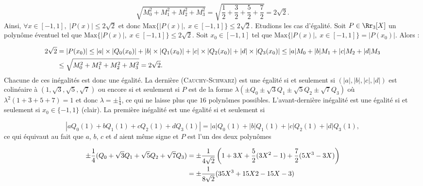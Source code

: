 {{$$\sqrt{M_0^2+M_1^2+M_2^2+M_3^2}=\sqrt{\frac{1}{2}+\frac{3}{2}+\frac{5}{2}+\frac{7}{2}}=2\sqrt{2}.$$
Ainsi, $\forall x\in[-1,1],\;|P(x)|\leq2\sqrt{2}$ et donc $\mbox{Max}\{|P(x)|,\;x\in[-1,1]\}\leq2\sqrt{2}$.
Etudions les cas d'égalité. Soit $P\in\Rr_3[X]$ un polynôme éventuel tel que $\mbox{Max}\{|P(x)|,\;x\in[-1,1]\}\leq2\sqrt{2}$.
Soit $x_0\in[-1,1]$ tel que $\mbox{Max}\{|P(x)|,\;x\in[-1,1]\}=|P(x_0)|$. Alors :

\begin{align*}\ensuremath
2\sqrt{2}&=|P(x_0)|\leq|a|\times|Q_0(x_0)|+|b|\times|Q_1(x_0)|+|c|\times|Q_2(x_0)|+|d|\times|Q_3(x_0)|\leq|a|M_0+|b|M_1+|c|M_2+|d|M_3\\
 &\leq\sqrt{M_0^2+M_1^2+M_2^2+M_3^2}=2\sqrt{2}.
\end{align*}
Chacune de ces inégalités est donc une égalité. La dernière (\textsc{Cauchy}-\textsc{Schwarz}) est une égalité si et seulement si $(|a|,|b|,|c|,|d|)$ est colinéaire à $(1,\sqrt{3},\sqrt{5},\sqrt{7})$ ou encore si et seulement si $P$ est de la forme $\lambda(\pm Q_0\pm\sqrt{3}Q_1\pm\sqrt{5}Q_2\pm\sqrt{7}Q_3)$ où $\lambda^2(1+3+5+7)=1$ et donc $\lambda=\pm\frac{1}{4}$, ce qui ne laisse plus que $16$ polynômes possibles. L'avant-dernière inégalité est une égalité si et seulement si $x_0\in\{-1,1\}$ (clair). La première inégalité est une égalité si et seulement si 

$$|aQ_0(1)+bQ_1(1)+cQ_2(1)+dQ_3(1)|=|a|Q_0(1)+|b|Q_1(1)+|c|Q_2(1)+|d|Q_3(1),$$
ce qui équivaut au fait que $a$, $b$, $c$ et $d$ aient même signe et $P$ est l'un des deux polynômes
 
\begin{align*}\ensuremath
\pm\frac{1}{4}(Q_0+\sqrt{3}Q_1+\sqrt{5}Q_2+\sqrt{7}Q_3)&=\pm\frac{1}{4\sqrt{2}}\left(1+3X+\frac{5}{2}(3X^2-1)
+\frac{7}{2}(5X^3-3X)\right)\\
 &=\pm\frac{1}{8\sqrt{2}}(35X^3+15X2-15X-3)
\end{align*}
}
}
